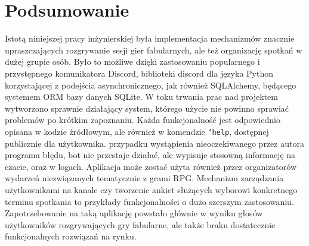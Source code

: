 \documentclass[shortabstract,inz]{iithesis}
\begin{document}
	\chapter{Podsumowanie}
	Istotą niniejszej pracy inżynierskiej była implementacja mechanizmów znacznie upraszczających rozgrywanie sesji gier fabularnych, ale też organizację spotkań w dużej grupie osób. Było to możliwe dzięki zastosowaniu popularnego i przystępnego komunikatora Discord, biblioteki discord dla języka Python korzystającej z podejścia asynchronicznego, jak również SQLAlchemy, będącego systemem ORM bazy danych SQLite. W toku trwania prac nad projektem wytworzono sprawnie działający system, którego użycie nie powinno sprawiać problemów po krótkim zapoznaniu. Każda funkcjonalność jest odpowiednio opisana w kodzie źródłowym, ale również w komendzie \texttt{`help}, dostępnej publicznie dla użytkownika.  przypadku wystąpienia nieoczekiwanego przez autora programu błędu, bot nie przestaje działać, ale wypisuje stosowną informację na czacie, oraz w logach. Aplikacja może zostać użyta również przez organizatorów wydarzeń niezwiązanych tematycznie z grami RPG. Mechanizm zarządzania użytkownikami na kanale czy tworzenie ankiet służących wyborowi konkretnego terminu spotkania to przykłady funkcjonalności o dużo szerszym zastosowaniu. Zapotrzebowanie na taką aplikację powstało głównie w wyniku głosów użytkowników rozgrywających gry fabularne, ale także braku dostatecznie funkcjonalnych rozwiązań na rynku.
	
\end{document}
